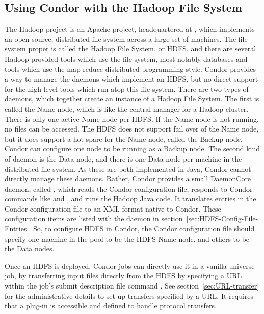 \subsection{\label{sec:Condor-HDFS}Using Condor with the Hadoop File System}

The Hadoop project is an Apache project,
headquartered at , 
which implements an open-source, distributed file system across a large set
of machines.  
The file system proper is called the Hadoop File System, or HDFS,
and there are several Hadoop-provided tools which use the file system,
most notably databases and tools which use 
the map-reduce distributed programming style.  
Condor provides a way to manage the daemons which implement an HDFS,
but no direct support for the high-level tools which run atop this file system.
There are two types of daemons, which together create an instance of 
a Hadoop File System.
The first is called the Name node, 
which is like the central manager for a Hadoop cluster.
There is only one active Name node per HDFS.
If the Name node is not running, no files can be accessed.
The HDFS does not support fail over of the Name node,
but it does support a hot-spare for the Name node,
called the Backup node.
Condor can configure one node to be running as a Backup node.
The second kind of daemon is the Data node,
and there is one Data node per machine in the distributed file system.
As these are both implemented in Java,
Condor cannot directly manage these daemons.
Rather, Condor provides a small DaemonCore daemon,
called ,
which reads the Condor configuration file, 
responds to Condor commands like  and ,
and runs the Hadoop Java code.
It translates entries in the Condor configuration file 
to an XML format native to Condor.
These configuration items are listed with the 
 daemon in section~\ref{sec:HDFS-Config-File-Entries}. 
So, to configure HDFS in Condor,
the Condor configuration file should specify one machine in the
pool to be the HDFS Name node, and others to be the Data nodes.

Once an HDFS is deployed, 
Condor jobs can directly use it in a vanilla universe job,
by transferring input files directly from the HDFS by specifying 
a URL within the job's submit description file command
. 
See section~\ref{sec:URL-transfer} for the administrative details
to set up transfers specified by a URL.
It requires that a plug-in is accessible and defined to handle
 protocol transfers. 

